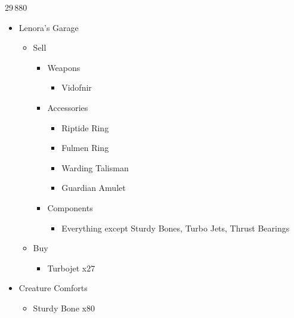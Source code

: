 \begin{multicols}{2}
  \begin{shop}{29\,880}
    \begin{itemize}
      \item Lenora's Garage
            \begin{itemize}
              \item Sell
                    \begin{itemize}
                      \item Weapons
                            \begin{itemize}
                              \item Vidofnir
                            \end{itemize}
                      \item Accessories
                            \begin{itemize}
                              \item Riptide Ring
                              \item Fulmen Ring
                              \item Warding Talisman
                              \item Guardian Amulet
                            \end{itemize}
                      \item Components
                            \begin{itemize}
                              \item Everything except Sturdy Bones, Turbo Jets, Thrust Bearings
                            \end{itemize}
                    \end{itemize}
              \item Buy
                    \begin{itemize}
                      \item Turbojet x27
                    \end{itemize}
            \end{itemize}
      \item Creature Comforts
            \begin{itemize}
              \item Sturdy Bone x80
            \end{itemize}
    \end{itemize}
  \end{shop}
  \vfill
  \begin{upgrade}

\end{upgrade}
\end{multicols}
